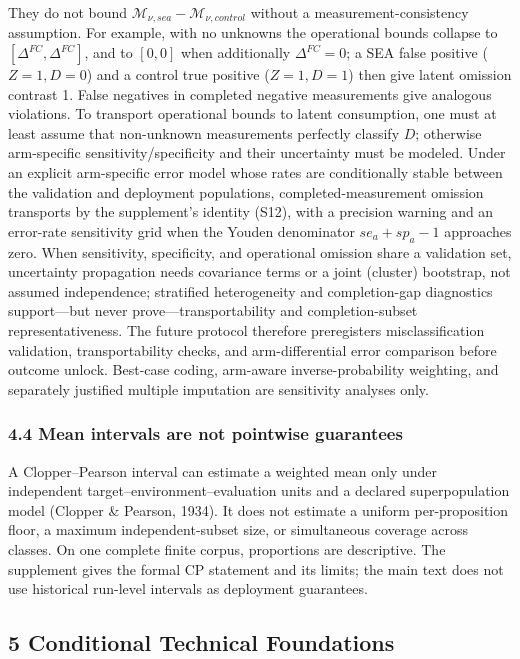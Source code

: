 \documentclass[
  11pt]{article}
\begin{document}
They do not bound \(\mathcal M_{\nu,sea}-\mathcal M_{\nu,control}\)
without a measurement-consistency assumption. For example, with no
unknowns the operational bounds collapse to
\([\Delta^{FC},\Delta^{FC}]\), and to \([0,0]\) when additionally
\(\Delta^{FC}=0\); a SEA false positive (\(Z=1,D=0\)) and a control true
positive (\(Z=1,D=1\)) then give latent omission contrast 1. False
negatives in completed negative measurements give analogous violations.
To transport operational bounds to latent consumption, one must at least
assume that non-unknown measurements perfectly classify \(D\); otherwise
arm-specific sensitivity/specificity and their uncertainty must be
modeled. Under an explicit arm-specific error model whose rates are
conditionally stable between the validation and deployment populations,
completed-measurement omission transports by the supplement's identity
(S12), with a precision warning and an error-rate sensitivity grid when
the Youden denominator \(se_a+sp_a-1\) approaches zero. When
sensitivity, specificity, and operational omission share a validation
set, uncertainty propagation needs covariance terms or a joint (cluster)
bootstrap, not assumed independence; stratified heterogeneity and
completion-gap diagnostics support---but never prove---transportability
and completion-subset representativeness. The future protocol therefore
preregisters misclassification validation, transportability checks, and
arm-differential error comparison before outcome unlock. Best-case
coding, arm-aware inverse-probability weighting, and separately
justified multiple imputation are sensitivity analyses only.

\subsubsection{4.4 Mean intervals are not pointwise
guarantees}\label{mean-intervals-are-not-pointwise-guarantees}

A Clopper--Pearson interval can estimate a weighted mean only under
independent target--environment--evaluation units and a declared
superpopulation model (Clopper \& Pearson, 1934). It does not estimate a
uniform per-proposition floor, a maximum independent-subset size, or
simultaneous coverage across classes. On one complete finite corpus,
proportions are descriptive. The supplement gives the formal CP
statement and its limits; the main text does not use historical
run-level intervals as deployment guarantees.

\subsection{5 Conditional Technical
Foundations}\label{conditional-technical-foundations}
\end{document}

